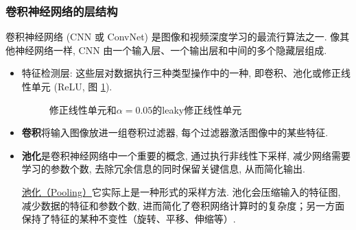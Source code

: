 \subsubsection{卷积神经网络的层结构}
卷积神经网络 (CNN 或 ConvNet) 是图像和视频深度学习的最流行算法之一.
像其他神经网络一样, CNN 由一个输入层、一个输出层和中间的多个隐藏层组成.
\begin{itemize}
    \item 特征检测层: 这些层对数据执行三种类型操作中的一种, 即卷积、池化或修正线性单元 (ReLU, 图 \ref{ReLU20200203001}).
    \begin{figure}[H]
    \begin{center}
    \end{center}
    \caption{修正线性单元和$\alpha=0.05$的leaky修正线性单元}
    \label{ReLU20200203001}
    \end{figure}
    \item \textbf{卷积}将输入图像放进一组卷积过滤器, 每个过滤器激活图像中的某些特征.
    \item \textbf{池化}是卷积神经网络中一个重要的概念, 通过执行非线性下采样, 减少网络需要学习的参数个数, 去除冗余信息的同时保留关键信息, 从而简化输出.

     \href{https://blog.csdn.net/tianwenbo6666/article/details/104349425}{池化（Pooling）}它实际上是一种形式的采样方法.
    池化会压缩输入的特征图, 减少数据的特征和参数个数, 进而简化了卷积网络计算时的复杂度；另一方面保持了特征的某种不变性（旋转、平移、伸缩等）.


\end{itemize}
